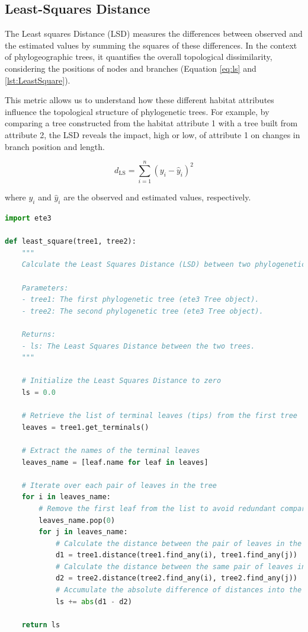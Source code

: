 \subsection{Least-Squares Distance}\label{LS}

The Least squares Distance (LSD) measures the differences between observed and the estimated values by summing the squares of these differences. In the context of phylogeographic trees, it quantifies the overall topological dissimilarity, considering the positions of nodes and branches (Equation \eqref{eq:ls} and \autoref{lst:LeastSquare}).

This metric allows us to understand how these different habitat attributes influence the topological structure of phylogenetic trees. For example, by comparing a tree constructed from the habitat attribute 1 with a tree built from attribute 2, the LSD reveals the impact, high or low, of attribute 1 on changes in branch position and length.

\begin{equation}\label{eq:ls}
    d_{\text{LS}} = \sum_{i=1}^{n} (y_i - \hat{y}_i)^2
\end{equation}

where $y_i$ and $\hat{y}_i$ are the observed and estimated values, respectively.

\begin{lstlisting}[label=lst:LeastSquare, language=Python, caption=Python script for calculating the LSD using the ete3 package in the aPhyloGeo package]
import ete3

def least_square(tree1, tree2):
    """
    Calculate the Least Squares Distance (LSD) between two phylogenetic trees.

    Parameters:
    - tree1: The first phylogenetic tree (ete3 Tree object).
    - tree2: The second phylogenetic tree (ete3 Tree object).

    Returns:
    - ls: The Least Squares Distance between the two trees.
    """
    
    # Initialize the Least Squares Distance to zero
    ls = 0.0
    
    # Retrieve the list of terminal leaves (tips) from the first tree
    leaves = tree1.get_terminals()
    
    # Extract the names of the terminal leaves
    leaves_name = [leaf.name for leaf in leaves]
    
    # Iterate over each pair of leaves in the tree
    for i in leaves_name:
        # Remove the first leaf from the list to avoid redundant comparisons
        leaves_name.pop(0)
        for j in leaves_name:
            # Calculate the distance between the pair of leaves in the first tree
            d1 = tree1.distance(tree1.find_any(i), tree1.find_any(j))
            # Calculate the distance between the same pair of leaves in the second tree
            d2 = tree2.distance(tree2.find_any(i), tree2.find_any(j))
            # Accumulate the absolute difference of distances into the LSD
            ls += abs(d1 - d2)
    
    return ls
\end{lstlisting}


